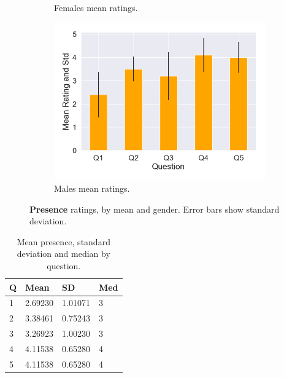 \begin{figure}[H]
\begin{subfigure}[b]{0.5\textwidth}
 \caption{Females mean ratings.}
 \label{fig:presFemale}
 \end{subfigure}
  \hspace{10mm}
 \begin{subfigure}[b]{\textwidth}
 \centering
 \includegraphics[scale=0.5]{Files/Plots/presence_mean_ratings_m.png}
 \caption{Males mean ratings.}
 \label{fig:presMale}
 \end{subfigure}
 \caption{\textbf{Presence} ratings, by mean and gender. Error bars show standard deviation.}
\label{fig:presAll}
\end{figure}



\begin{table}
\begin{tabular}{|llll|}
\hline
Q & Mean & SD & Med \\
\hline
1 &  2.69230 & 1.01071&3\\  
2 &  3.38461 & 0.75243&3\\ 
3 &  3.26923 & 1.00230&3\\ 
4 &  4.11538 & 0.65280&4\\  
5 &  4.11538 & 0.65280&4\\  
\hline
\end{tabular}
\caption{Mean presence, standard deviation and median by question.}
\label{tbl:pres}
\end{table} 

\clearpage

